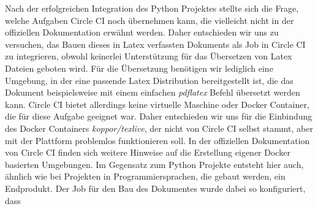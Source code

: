 \documentclass[11pt]{article}
\begin{document}
Nach der erfolgreichen Integration des Python Projektes stellte sich die Frage, welche Aufgaben Circle CI noch übernehmen kann, die vielleicht nicht in der offiziellen Dokumentation erwähnt werden. Daher entschieden wir uns zu versuchen, das Bauen dieses in Latex verfassten Dokuments als Job in Circle CI zu integrieren, obwohl keinerlei Unterstützung für das Übersetzen von Latex Dateien geboten wird. Für die Übersetzung benötigen wir lediglich eine Umgebung, in der eine passende Latex Distribution bereitgestellt ist, die das Dokument beispielsweise mit einem einfachen \textit{pdflatex} Befehl übersetzt werden kann. Circle CI bietet allerdings keine virtuelle Maschine oder Docker Container, die für diese Aufgabe geeignet war. Daher entschieden wir uns für die Einbindung des Docker Containers \textit{koppor/texlive}, der nicht von Circle CI selbst stammt, aber mit der Plattform problemlos funktionieren soll. In der offiziellen Dokumentation von Circle CI finden sich weitere Hinweise auf die Erstellung eigener Docker basierten Umgebungen. Im Gegensatz zum Python Projekte entsteht hier auch, ähnlich wie bei Projekten in Programmiersprachen, die gebaut werden, ein Endprodukt. Der Job für den Bau des Dokumentes wurde dabei so konfiguriert, dass 
\end{document}
